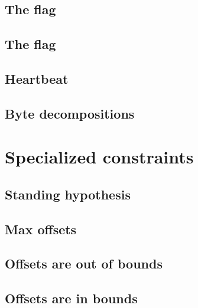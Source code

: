 \subsection{The \noop{} flag}                                                                    \label{mxp: noop}
\subsection{The \mayTriggerNonTrivialOperation{} flag}                                         \label{mxp: may trigger non trivial operation}
\subsection{Heartbeat}                                                                      \label{mxp: heartbeat}
\subsection{Byte decompositions}                                                              \label{mxp: byte decompositions}
                                                                                                             
\section{Specialized constraints}                                                                            \label{mxp: specialized constraints}
\subsection{Standing hypothesis}                                                         
\subsection{Max offsets}                                                                  
\subsection{Offsets are out of bounds}                                            
\subsection{Offsets are in bounds}                                                                           
